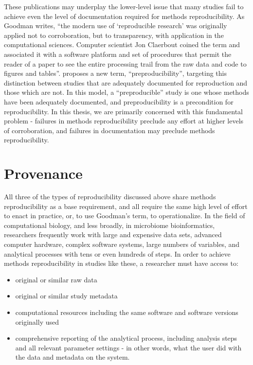 These publications may underplay the lower-level issue that many studies
fail to achieve even the level of documentation required for methods
reproducibility. As Goodman writes, “the modern use of ‘reproducible research’
was originally applied not to corroboration, but to transparency, with
application in the computational sciences. Computer scientist Jon Claerbout
coined the term and associated it with a software platform and set of procedures
that permit the reader of a paper to see the entire processing trail from the
raw data and code to figures and tables”\parencite[1]{goodman_what_2016}.
\textcite{stark_before_2018} proposes a new term,
“preproducibility”, targeting this distinction between studies that are
adequately documented for reproduction and those which are not. In this
model, a “preproducible” study is one whose methods have been adequately
documented, and preproducibility is a precondition for reproducibility. In this
thesis, we are primarily concerned with this fundamental problem - failures in
methods reproducibility preclude any effort at higher levels of corroboration,
and failures in documentation may preclude methods reproducibility.

\section{Provenance}

All three of the types of reproducibility discussed above share methods
reproducibility as a base requirement, and all require the same high level of
effort to enact in practice, or, to use Goodman’s term, to operationalize. In
the field of computational biology, and less broadly, in microbiome
bioinformatics, researchers frequently work with large and expensive data sets,
advanced computer hardware, complex software systems, large numbers of
variables, and analytical processes with tens or even hundreds of steps. In
order to achieve methods reproducibility in studies like these, a researcher
must have access to:

\begin{itemize}
    \item original or similar raw data
    \item original or similar study metadata
    \item computational resources including the same software and software versions originally used
    \item comprehensive reporting of the analytical process, including analysis
        steps and all relevant parameter settings - in other words, what the user
        did with the data and metadata on the system.
\end{itemize}

